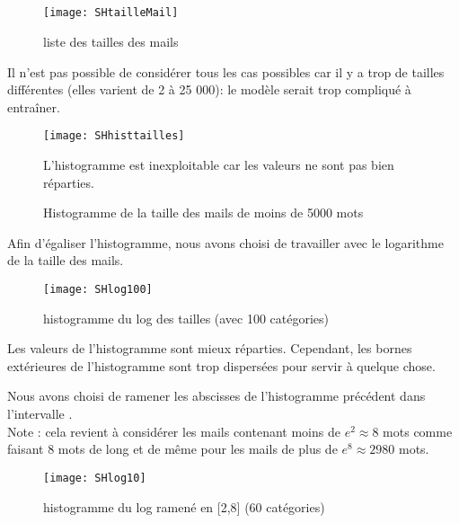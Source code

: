\documentclass[a4paper]{article}
\begin{document}
\subsection{}
\begin{minipage}{\textwidth}
\begin{figure}[H]
\texttt{[image: SHtailleMail]}
\caption{liste des tailles des mails}
\centering
\end{figure}
Il n’est pas possible de considérer tous les cas possibles car il y a trop de tailles différentes (elles varient de 2 à 25 000): le modèle serait trop compliqué à entraîner.
\begin{figure}[H]
\texttt{[image: SHhisttailles]}
\caption{Histogramme de la taille des mails de moins de 5000 mots}
\centering
{\footnotesize L'histogramme est inexploitable car les valeurs ne sont pas bien réparties.\par}
\end{figure}
\end{minipage}


\begin{minipage}{\textwidth}
Afin d'égaliser l'histogramme, nous avons choisi de travailler avec le logarithme de la taille des mails.
\begin{figure}[H]
\texttt{[image: SHlog100]}
\caption{histogramme du log des tailles (avec 100 catégories)}
\end{figure}
Les valeurs de l'histogramme sont mieux réparties. Cependant, les bornes extérieures de l'histogramme sont trop dispersées pour servir à quelque chose.
\end{minipage}

\begin{minipage}{\textwidth}
Nous avons choisi de ramener les abscisses de l'histogramme précédent dans l'intervalle \text{[2,8]}.\\ Note : cela revient à considérer les mails contenant moins de $e^2\approx 8$ mots comme faisant 8 mots de long et de même pour les mails de plus de $e^8\approx 2980$ mots.
\begin{figure}[H]
\texttt{[image: SHlog10]}
\caption{histogramme du log ramené en [2,8] (60 catégories)}
\end{figure}
\end{minipage}
\end{document}
